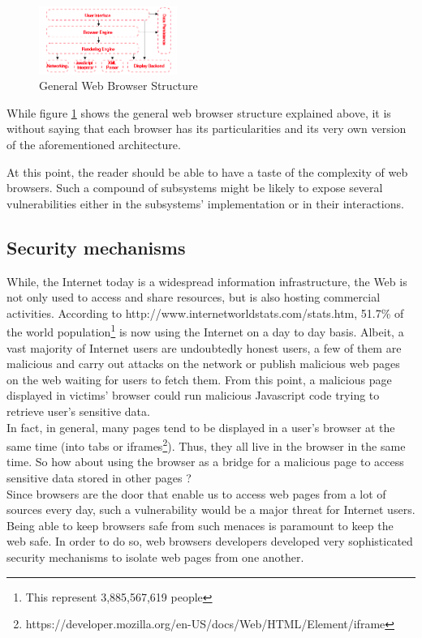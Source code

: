 \documentclass[journal]{IEEEtran}
\begin{document}
\begin{figure}[h]
\centering
\includegraphics[width=0.4\textwidth]{images/BrowserStructure.png}
\caption{General Web Browser Structure}
\label{fig:browserStructure}
\end{figure}

While figure \ref{fig:browserStructure} shows the general web browser structure explained above, it is without saying that each browser has its particularities and its very own version of the aforementioned architecture.

\medskip

At this point, the reader should be able to have a taste of the complexity of web browsers. Such a compound of subsystems might be likely to expose several vulnerabilities either in the subsystems' implementation or in their interactions.

\subsection{Security mechanisms}
While, the Internet today is a widespread information infrastructure, the Web is not only used to access and share resources, but is also hosting commercial activities. According to http://www.internetworldstats.com/stats.htm, 51.7\% of the world population\footnote{This represent 3,885,567,619 people} is now using the Internet on a day to day basis. Albeit, a vast majority of Internet users are undoubtedly honest users, a few of them are malicious and carry out attacks on the network or publish malicious web pages on the web waiting for users to fetch them. From this point, a malicious page displayed in victims' browser could run malicious Javascript code trying to retrieve user's sensitive data. \\
In fact, in general, many pages tend to be displayed in a user's browser at the same time (into tabs or iframes\footnote{https://developer.mozilla.org/en-US/docs/Web/HTML/Element/iframe}). Thus, they all live in the browser in the same time. So how about using the browser as a bridge for a malicious page to access sensitive data stored in other pages ? \\

Since browsers are the door that enable us to access web pages from a lot of sources every day, such a vulnerability would be a major threat for Internet users. Being able to keep browsers safe from such menaces is paramount to keep the web safe. In order to do so, web browsers developers developed very sophisticated security mechanisms to isolate web pages from one another.
\end{document}
